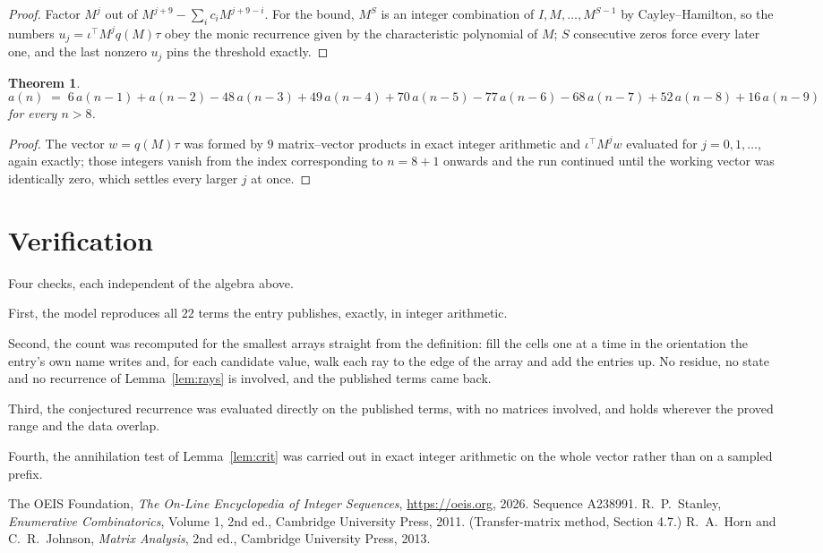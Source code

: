 \documentclass[11pt,a4paper]{article}
\theoremstyle{plain}
\newtheorem{theorem}{Theorem}
\theoremstyle{definition}
\begin{document}
\begin{proof}
Factor $M^{j}$ out of $M^{j+9}-\sum_ic_iM^{j+9-i}$. For the bound, $M^{S}$
is an integer combination of $I,M,\dots,M^{S-1}$ by Cayley--Hamilton, so the numbers
$u_j=\iota^{\!\top}M^{j}q(M)\tau$ obey the monic recurrence given by the characteristic
polynomial of $M$; $S$ consecutive zeros force every later one, and the last nonzero $u_j$
pins the threshold exactly.
\end{proof}

\begin{theorem}
\[
a(n)\;=\;6\,a(n-1) + a(n-2) - 48\,a(n-3) + 49\,a(n-4) + 70\,a(n-5) - 77\,a(n-6) - 68\,a(n-7) + 52\,a(n-8) + 16\,a(n-9)
\]
for every $n>8$.
\end{theorem}

\begin{proof}
The vector $w=q(M)\tau$ was formed by $9$ matrix--vector products in exact integer
arithmetic and $\iota^{\!\top}M^{j}w$ evaluated for $j=0,1,\dots$, again exactly; those
integers vanish from the index corresponding to $n=8+1$ onwards and the run continued
until the working vector was identically zero, which settles every larger $j$ at once.
\end{proof}

\section{Verification}

Four checks, each independent of the algebra above.

First, the model reproduces all $22$ terms the entry publishes, exactly, in integer
arithmetic.

Second, the count was recomputed for the smallest arrays straight from the definition: fill the
cells one at a time in the orientation the entry's own name writes and, for each candidate
value, walk each ray to the edge of the array and add the entries up. No residue, no state and
no recurrence of Lemma~\ref{lem:rays} is involved, and the published terms came back.

Third, the conjectured recurrence was evaluated directly on the published terms, with no
matrices involved, and holds wherever the proved range and the data overlap.

Fourth, the annihilation test of Lemma~\ref{lem:crit} was carried out in exact integer
arithmetic on the whole vector rather than on a sampled prefix.

\begin{thebibliography}{9}
 The OEIS Foundation, \emph{The On-Line Encyclopedia of Integer
Sequences}, \url{https://oeis.org}, 2026. Sequence A238991.
 R.~P.~Stanley, \emph{Enumerative Combinatorics}, Volume 1, 2nd ed.,
Cambridge University Press, 2011. (Transfer-matrix method, Section 4.7.)
 R.~A.~Horn and C.~R.~Johnson, \emph{Matrix Analysis}, 2nd ed., Cambridge
University Press, 2013.
\end{thebibliography}
\end{document}
